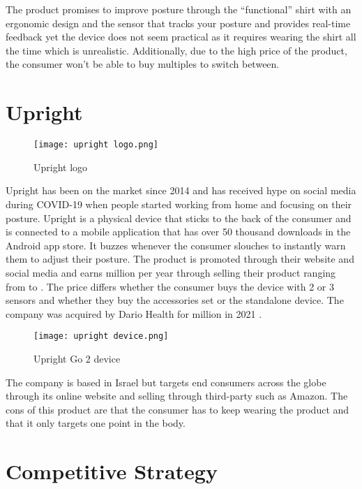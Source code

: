 The product promises to improve posture through the “functional” shirt with an ergonomic design and the sensor that tracks your posture and provides real-time feedback yet the device does not seem practical as it requires wearing the shirt all the time which is unrealistic. Additionally, due to the high price of the product, the consumer won’t be able to buy multiples to switch between.

\section{Upright}

\begin{figure}[h!]
    \centering
    \texttt{[image: upright logo.png]}
    \caption{Upright logo}
    \label{fig:enter-label}
\end{figure}

Upright has been on the market since 2014 \cite{uprightpose} and has received hype on social media during COVID-19 when people started working from home and focusing on their posture. Upright is a physical device that sticks to the back of the consumer and is connected to a mobile application that has over 50 thousand downloads in the Android app store. It buzzes whenever the consumer slouches to instantly warn them to adjust their posture. The product is promoted through their website and social media and earns  million per year through selling their product \cite{upright_growjo} ranging from  to . The price differs whether the consumer buys the device with 2 or 3 sensors and whether they buy the accessories set or the standalone device. The company was acquired by Dario Health for  million in 2021 \cite{dariohealth_acquisition}. 

\begin{figure}[h!]
    \centering
    \texttt{[image: upright device.png]}
    \caption{Upright Go 2 device}
    \label{fig:enter-label2}
\end{figure}

The company is based in Israel but targets end consumers across the globe through its online website and selling through third-party such as Amazon. The cons of this product are that the consumer has to keep wearing the product and that it only targets one point in the body.

\section{Competitive Strategy}

